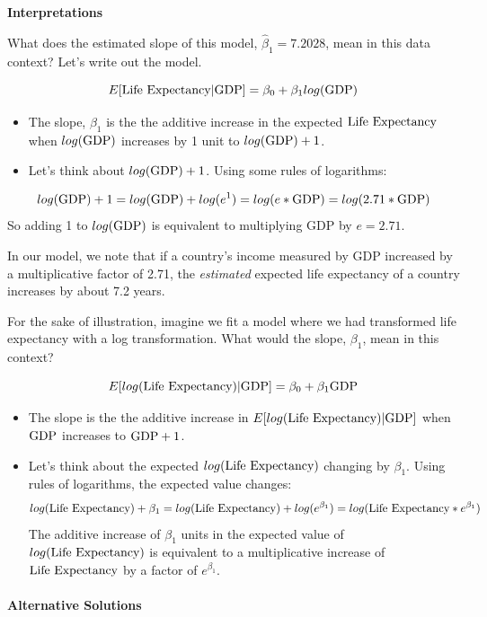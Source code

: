 \documentclass[
]{book}
\begin{document}
\textbf{Interpretations}

What does the estimated slope of this model, \(\hat{\beta}_1 = 7.2028\), mean in this data context? Let's write out the model.

\[E[\hbox{Life Expectancy} | \hbox{GDP} ] = \beta_0 + \beta_1 log(\hbox{GDP})\]

\begin{itemize}
\item
  The slope, \(\beta_1\) is the the additive increase in the expected \(\hbox{Life Expectancy}\) when \(log(\hbox{GDP})\) increases by 1 unit to \(log(\hbox{GDP}) + 1\).
\item
  Let's think about \(log(\hbox{GDP}) + 1\). Using some rules of logarithms:
\end{itemize}

\[log(\hbox{GDP}) + 1 = log(\hbox{GDP}) + log(e^1) = log(e*\hbox{GDP}) = log(2.71*\hbox{GDP})\]
So adding 1 to \(log(\hbox{GDP})\) is equivalent to multiplying GDP by \(e=2.71\).

In our model, we note that if a country's income measured by GDP increased by a multiplicative factor of 2.71, the \emph{estimated} expected life expectancy of a country increases by about 7.2 years.

For the sake of illustration, imagine we fit a model where we had transformed life expectancy with a log transformation. What would the slope, \(\beta_1\), mean in this context?

\[E[log(\hbox{Life Expectancy}) | \hbox{GDP} ] = \beta_0 + \beta_1 \hbox{GDP}\]

\begin{itemize}
\item
  The slope is the the additive increase in \(E[log(\hbox{Life Expectancy}) | \hbox{GDP} ]\) when \(\hbox{GDP}\) increases to \(\hbox{GDP} + 1\).
\item
  Let's think about the expected \(log(\hbox{Life Expectancy})\) changing by \(\beta_1\). Using rules of logarithms, the expected value changes:
  \[log(\hbox{Life Expectancy}) + \beta_1 = log(\hbox{Life Expectancy}) + log(e^{\beta_1}) = log(\hbox{Life Expectancy} * e^{\beta_1}) \]
  The additive increase of \(\beta_1\) units in the expected value of \(log(\hbox{Life Expectancy})\) is equivalent to a multiplicative increase of \(\hbox{Life Expectancy}\) by a factor of \(e^{\beta_1}\).
\end{itemize}

\paragraph{Alternative Solutions}\label{alternative-solutions}
\end{document}
